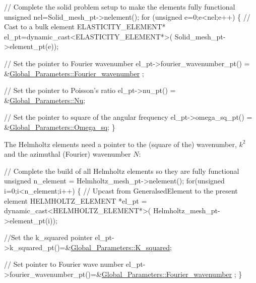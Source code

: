 \begin{DoxyCodeInclude}

 \textcolor{comment}{// Complete the solid problem setup to make the elements fully functional}
 \textcolor{keywordtype}{unsigned} nel=Solid\_mesh\_pt->nelement();
 \textcolor{keywordflow}{for} (\textcolor{keywordtype}{unsigned} e=0;e<nel;e++)
  \{     
   \textcolor{comment}{// Cast to a bulk element}
   ELASTICITY\_ELEMENT* el\_pt=\textcolor{keyword}{dynamic\_cast<}ELASTICITY\_ELEMENT*\textcolor{keyword}{>}(
    Solid\_mesh\_pt->element\_pt(e));

   \textcolor{comment}{// Set the pointer to Fourier wavenumber}
   el\_pt->fourier\_wavenumber\_pt() = &\hyperlink{namespaceGlobal__Parameters_ae1198385d90f52c4ed921520ae43a9e7}{Global\_Parameters::Fourier\_wavenumber}
      ;
   
   \textcolor{comment}{// Set the pointer to Poisson's ratio}
   el\_pt->nu\_pt() = &\hyperlink{namespaceGlobal__Parameters_a373950a959cd784c8f8028099807c2fb}{Global\_Parameters::Nu};
      
   \textcolor{comment}{// Set the pointer to square of the angular frequency}
   el\_pt->omega\_sq\_pt() = &\hyperlink{namespaceGlobal__Parameters_a91314f7f1cc80c43543948568f50f405}{Global\_Parameters::Omega\_sq};
  \}

\end{DoxyCodeInclude}


The Helmholtz elements need a pointer to the (square of the) wavenumber, $ k^2 $ and the azimuthal (Fourier) wavenumber $ N $\+:


\begin{DoxyCodeInclude}

 \textcolor{comment}{// Complete the build of all Helmholtz elements so they are fully functional}
 \textcolor{keywordtype}{unsigned} n\_element = Helmholtz\_mesh\_pt->nelement();
 \textcolor{keywordflow}{for}(\textcolor{keywordtype}{unsigned} i=0;i<n\_element;i++)
  \{
   \textcolor{comment}{// Upcast from GeneralsedElement to the present element}
   HELMHOLTZ\_ELEMENT *el\_pt = \textcolor{keyword}{dynamic\_cast<}HELMHOLTZ\_ELEMENT*\textcolor{keyword}{>}(
    Helmholtz\_mesh\_pt->element\_pt(i));
   
   \textcolor{comment}{//Set the k\_squared pointer}
   el\_pt->k\_squared\_pt()=&\hyperlink{namespaceGlobal__Parameters_a91a3fa265abaf9e724c668ee800ffb29}{Global\_Parameters::K\_squared};
   
   \textcolor{comment}{// Set pointer to Fourier wave number}
   el\_pt->fourier\_wavenumber\_pt()=&\hyperlink{namespaceGlobal__Parameters_ae1198385d90f52c4ed921520ae43a9e7}{Global\_Parameters::Fourier\_wavenumber}
      ;
  \}

\end{DoxyCodeInclude}


